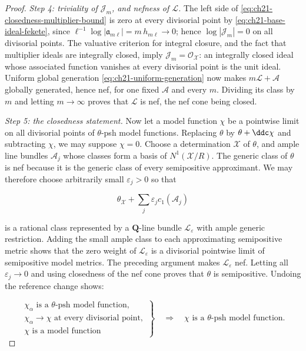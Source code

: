 \begin{proof}
\emph{Step 4: triviality of \(\mathcal J_m\), and nefness of
\(\mathcal L\).}
The left side of \eqref{eq:ch21-closedness-multiplier-bound}
is zero at every divisorial point by
\eqref{eq:ch21-base-ideal-fekete}, since
\(\ell^{-1}\log|\mathfrak a_{m\ell}|=m\,h_{m\ell}\to0\); hence
\(\log|\mathcal J_m|=0\) on all divisorial points.  The valuative criterion
for integral closure, and the fact that multiplier ideals are integrally
closed, imply \(\mathcal J_m=\mathcal O_{\mathcal X}\): an integrally closed
ideal whose associated function vanishes at every divisorial point is the
unit ideal.  Uniform global
generation \eqref{eq:ch21-uniform-generation}
now makes \(m\mathcal L+\mathcal A\) globally generated, hence
nef, for one fixed \(\mathcal A\) and every \(m\).  Dividing its class by
\(m\) and letting \(m\to\infty\) proves that \(\mathcal L\) is nef, the nef
cone being closed.

\emph{Step 5: the closedness statement.}
Now let a model function \(\chi\) be a pointwise limit on all divisorial
points of \(\theta\)-psh model functions.  Replacing \(\theta\) by
\(\theta+\ddc\chi\) and subtracting \(\chi\), we may suppose
\(\chi=0\).  Choose a determination \(\mathcal X\) of \(\theta\), and ample
line bundles \(\mathcal A_j\) whose classes form a basis of
\(N^1(\mathcal X/R)\).  The generic class of \(\theta\) is nef because it is
the generic class of every semipositive approximant.  We may therefore
choose arbitrarily small \(\varepsilon_j>0\) so that

\[
          \theta_{\mathcal X}+\sum_j\varepsilon_jc_1(\mathcal A_j)
\]

is a rational class represented by a \(\mathbf Q\)-line bundle
\(\mathcal L_{\varepsilon}\) with ample generic restriction.  Adding the
small ample class to each approximating semipositive metric shows that the
zero weight of \(\mathcal L_{\varepsilon}\) is a divisorial pointwise limit
of semipositive model metrics.  The preceding argument makes
\(\mathcal L_{\varepsilon}\) nef.  Letting all \(\varepsilon_j\to0\) and
using closedness of the nef cone proves that \(\theta\) is semipositive.
Undoing the reference change shows:

\begin{equation}
\label{eq:ch21-model-closedness}
 \left.
 \begin{array}{c}
 \chi_\alpha\text{ is a \(\theta\)-psh model function},\\
 \chi_\alpha\to\chi\text{ at every divisorial point},\\
 \chi\text{ is a model function}
 \end{array}
 \right\}
 \quad\Longrightarrow\quad
 \chi\text{ is a \(\theta\)-psh model function}.
\end{equation}


\end{proof}
